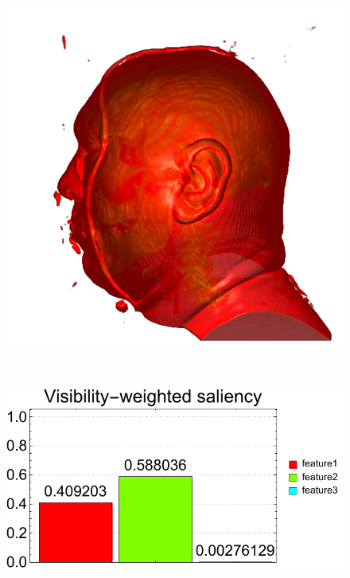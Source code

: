 \begin{figure}
\begin{minipage}{.24\textwidth}
		\includegraphics[width=1\linewidth]{images/vismale_strong_red}
		\subcaption{}
	\end{minipage}~
	\begin{minipage}{.25\textwidth}
		\includegraphics[width=1\linewidth]{figures/vismale_strong_red_visibility_saliency_weighted_chart}
		\subcaption{}
	\end{minipage}~
	\begin{minipage}{.24\textwidth}

\end{minipage}
\end{figure}
